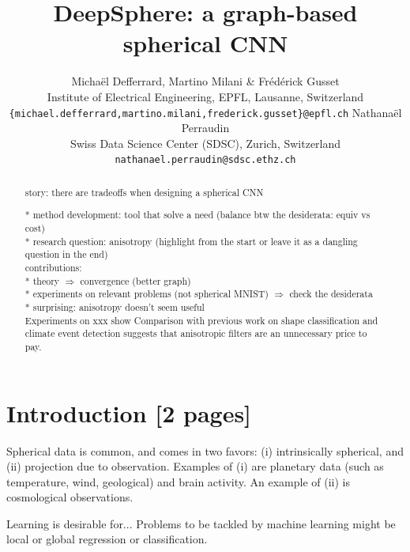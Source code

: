 \documentclass{article} %
\title{DeepSphere: a graph-based spherical CNN}
\author{Michaël Defferrard, Martino Milani \& Frédérick Gusset \\
Institute of Electrical Engineering, EPFL, Lausanne, Switzerland \\
\texttt{\{michael.defferrard,martino.milani,frederick.gusset\}@epfl.ch}
\AND
Nathanaël Perraudin \\
Swiss Data Science Center (SDSC), Zurich, Switzerland \\
\texttt{nathanael.perraudin@sdsc.ethz.ch}
}
\newcommand{\todo}[1]{{\color[rgb]{.6,.1,.6}{#1}}}
\begin{document}
\maketitle

\begin{abstract}

story: there are tradeoffs when designing a spherical CNN

* method development: tool that solve a need (balance btw the desiderata: equiv vs cost)\\
* research question: anisotropy (highlight from the start or leave it as a dangling question in the end)\\

contributions:\\
* theory $\Rightarrow$ convergence (better graph)\\
* experiments on relevant problems (not spherical MNIST) $\Rightarrow$ check the desiderata\\
  * surprising: anisotropy doesn't seem useful\\

Experiments on xxx show
Comparison with previous work on shape classification and climate event detection suggests that anisotropic filters are an unnecessary price to pay.

\end{abstract}

\todo{
	* adjacency matrix: $A$ instead of $W$? \\
	* anonymize DeepSphere citation
}

\section{Introduction [2 pages]}

Spherical data is common, and comes in two favors: (i) intrinsically spherical, and (ii) projection due to observation.
Examples of (i) are planetary data (such as temperature, wind, geological) and brain activity.
An example of (ii) is cosmological observations.

Learning is desirable for...
Problems to be tackled by machine learning might be local or global regression or classification.
\end{document}

